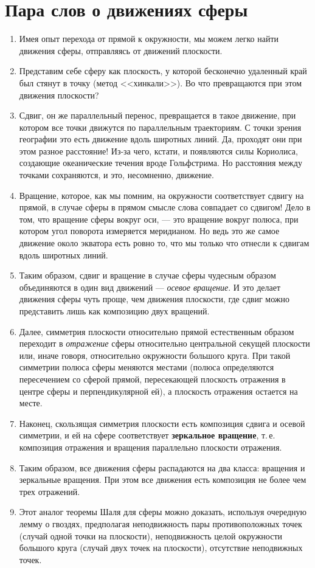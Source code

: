 \section{Пара слов о движениях сферы}



\begin{enumerate}
\item Имея опыт перехода от прямой к окружности, мы можем легко найти движения сферы, отправляясь от движений плоскости.
\item Представим себе сферу как плоскость, у которой бесконечно удаленный край был стянут в точку (метод <<хинкали>>). Во что превращаются при этом движения плоскости?
\item Сдвиг, он же параллельный перенос, превращается в такое движение, при котором все точки движутся по параллельным траекториям. С точки зрения географии это есть движение вдоль широтных линий. Да, проходят они при этом разное расстояние! Из-за чего, кстати, и появляются силы Кориолиса, создающие океанические течения вроде Гольфстрима. Но расстояния между точками сохраняются, и это, несомненно, движение. 
\item Вращение, которое, как мы помним, на окружности соответствует сдвигу на прямой, в случае сферы в прямом смысле слова совпадает со сдвигом! Дело в том, что вращение сферы вокруг оси, --- это вращение вокруг полюса, при котором угол поворота измеряется меридианом. Но ведь это же самое движение около экватора есть ровно то, что мы только что отнесли к сдвигам вдоль широтных линий.
\item Таким образом, сдвиг и вращение в случае сферы чудесным образом объединяются в один вид движений --- \textit{осевое вращение}. И это делает движения сферы чуть проще, чем движения плоскости, где сдвиг можно представить лишь как композицию двух вращений.
\item Далее, симметрия плоскости относительно прямой естественным образом переходит в \textit{отражение} сферы относительно центральной секущей плоскости или, иначе говоря, относительно окружности большого круга. При такой симметрии полюса сферы меняются местами (полюса определяются пересечением со сферой прямой, пересекающей плоскость отражения в центре сферы и перпендикулярной ей), а плоскость отражения остается на месте.
\item Наконец, скользящая симметрия плоскости есть композиция сдвига и осевой симметрии, и ей на сфере соответствует \textbf{зеркальное вращение}, т.\,е. композиция отражения и вращения параллельно плоскости отражения.
\item Таким образом, все движения сферы распадаются на два класса: вращения и зеркальные вращения. При этом все движения есть композиция не более чем трех отражений.
\item Этот аналог теоремы Шаля для сферы можно доказать, используя очередную лемму о гвоздях, предполагая неподвижность пары противоположных точек (случай одной точки на плоскости), неподвижность целой окружности большого круга (случай двух точек на плоскости), отсутствие неподвижных точек.
\end{enumerate}
